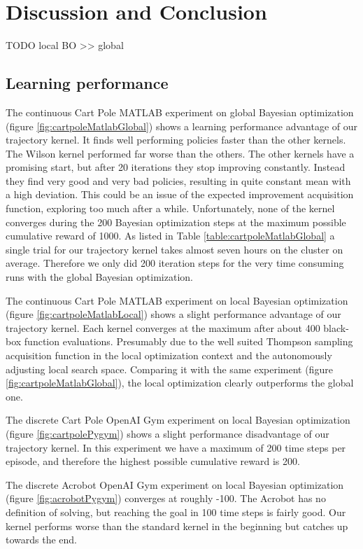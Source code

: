 \chapter{Discussion and Conclusion}
\label{chap:6}
TODO local BO >> global
\section{Learning performance}
The continuous Cart Pole MATLAB experiment on global Bayesian optimization (figure \ref{fig:cartpoleMatlabGlobal}) shows a learning performance advantage of our trajectory kernel. It finds well performing policies faster than the other kernels. The Wilson kernel performed far worse than the others. The other kernels have a promising start, but after 20 iterations they stop improving constantly. Instead they find very good and very bad policies, resulting in quite constant mean with a high deviation. This could be an issue of the expected improvement acquisition function, exploring too much after a while. Unfortunately, none of the kernel converges during the 200 Bayesian optimization steps at the maximum possible cumulative reward of 1000. As listed in Table \ref{table:cartpoleMatlabGlobal} a single trial for our trajectory kernel takes almost seven hours on the cluster on average. Therefore we only did 200 iteration steps for the very time consuming runs with the global Bayesian optimization.

The continuous Cart Pole MATLAB experiment on local Bayesian optimization (figure \ref{fig:cartpoleMatlabLocal}) shows a slight performance advantage of our trajectory kernel. Each kernel converges at the maximum after about 400 black-box function evaluations. Presumably due to the well suited Thompson sampling acquisition function in the local optimization context and the autonomously adjusting local search space. Comparing it with the same experiment (figure \ref{fig:cartpoleMatlabGlobal}), the local optimization clearly outperforms the global one.

The discrete Cart Pole OpenAI Gym experiment on local Bayesian optimization (figure \ref{fig:cartpolePygym}) shows a slight performance disadvantage of our trajectory kernel. In this experiment we have a maximum of 200 time steps per episode, and therefore the highest possible cumulative reward is 200.

The discrete Acrobot OpenAI Gym experiment on local Bayesian optimization (figure \ref{fig:acrobotPygym}) converges at roughly -100. The Acrobot has no definition of solving, but reaching the goal in 100 time steps is fairly good. Our kernel performs worse than the standard kernel in the beginning but catches up towards the end.

